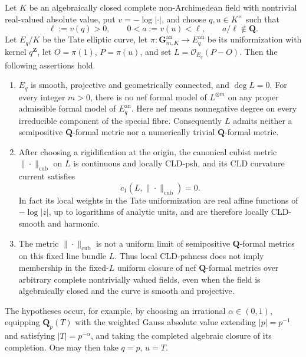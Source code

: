 \begin{theorem}
\label{thm:p081-irrational-tate-period-obstruction}
Let \(K\) be an algebraically closed complete non-Archimedean field with
nontrivial real-valued absolute value, put \(v=-\log|\cdot|\), and choose
\(q,u\in K^\times\) such that
\[
  \ell:=v(q)>0,\qquad 0<a:=v(u)<\ell,
  \qquad a/\ell\notin\mathbf Q.
\]
Let \(E_q/K\) be the Tate elliptic curve, let
\(\pi:\mathbf G_{m,K}^{\mathrm{an}}\to E_q^{\mathrm{an}}\)
be its uniformization with kernel \(q^{\mathbf Z}\), let
\(O=\pi(1)\), \(P=\pi(u)\), and set
\(L=\mathcal O_{E_q}(P-O)\).
Then the following assertions hold.
\begin{enumerate}
\item
\(E_q\) is smooth, projective and geometrically connected, and \(\deg L=0\).
For every integer \(m>0\), there is no nef formal model of
\(L^{\otimes m}\) on any proper admissible formal model of
\(E_q^{\mathrm{an}}\). Here nef means nonnegative degree on every
irreducible component of the special fibre.
Consequently \(L\) admits neither a semipositive
\(\mathbf Q\)-formal metric nor a numerically trivial
\(\mathbf Q\)-formal metric.
\item
After choosing a rigidification at the origin, the canonical cubist
metric \(\|\cdot\|_{\mathrm{cub}}\) on \(L\) is continuous and locally
CLD-psh, and its CLD curvature current satisfies
\[
 c_1(L,\|\cdot\|_{\mathrm{cub}})=0.
\]
In fact its local weights in the Tate uniformization are real affine
functions of \(-\log|z|\), up to logarithms of analytic units, and are
therefore locally CLD-smooth and harmonic.
\item
The metric \(\|\cdot\|_{\mathrm{cub}}\) is not a uniform limit of
semipositive \(\mathbf Q\)-formal metrics on this fixed line bundle
\(L\). Thus local CLD-pshness does not imply membership in the
fixed-\(L\) uniform closure of nef \(\mathbf Q\)-formal metrics over
arbitrary complete nontrivially valued fields, even when the field is
algebraically closed and the curve is smooth and projective.
\end{enumerate}
The hypotheses occur, for example, by choosing an irrational
\(\alpha\in(0,1)\), equipping \(\mathbf Q_p(T)\) with the weighted
Gauss absolute value extending \(|p|=p^{-1}\) and satisfying
\(|T|=p^{-\alpha}\), and taking the completed algebraic closure of its
completion. One may then take \(q=p\), \(u=T\).
\end{theorem}
